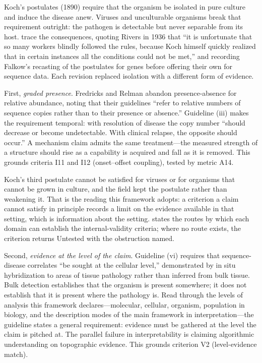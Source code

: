 \documentclass{article}
\begin{document}
Koch's postulates (1890) require that the organism be isolated in pure culture and induce the disease anew. Viruses and unculturable organisms break that requirement outright: the pathogen is detectable but never separable from its host. \citet{fredricks1996sequence} trace the consequences, quoting Rivers in 1936 that ``it is unfortunate that so many workers blindly followed the rules, because Koch himself quickly realized that in certain instances all the conditions could not be met,'' and recording Falkow's recasting of the postulates for genes before offering their own for sequence data. Each revision replaced isolation with a different form of evidence.

First, \emph{graded presence}. Fredricks and Relman abandon presence-absence for relative abundance, noting that their guidelines ``refer to relative numbers of sequence copies rather than to their presence or absence.'' Guideline (iii) makes the requirement temporal: with resolution of disease the copy number ``should decrease or become undetectable. With clinical relapse, the opposite should occur.'' A mechanism claim admits the same treatment---the measured strength of a structure should rise as a capability is acquired and fall as it is removed. This grounds criteria I11 and I12 (onset--offset coupling), tested by metric A14.

Koch's third postulate cannot be satisfied for viruses or for organisms that cannot be grown in culture, and the field kept the postulate rather than weakening it. That is the reading this framework adopts: a criterion a claim cannot satisfy in principle records a limit on the evidence available in that setting, which is information about the setting.  states the routes by which each domain can establish the internal-validity criteria; where no route exists, the criterion returns Untested with the obstruction named.

Second, \emph{evidence at the level of the claim}. Guideline (vi) requires that sequence-disease correlates ``be sought at the cellular level,'' demonstrated by in situ hybridization to areas of tissue pathology rather than inferred from bulk tissue. Bulk detection establishes that the organism is present somewhere; it does not establish that it is present where the pathology is. Read through the levels of analysis this framework declares---molecular, cellular, organism, population in biology, and the description modes of the main framework in interpretation---the guideline states a general requirement: evidence must be gathered at the level the claim is pitched at. The parallel failure in interpretability is claiming algorithmic understanding on topographic evidence. This grounds criterion V2 (level-evidence match).
\end{document}
